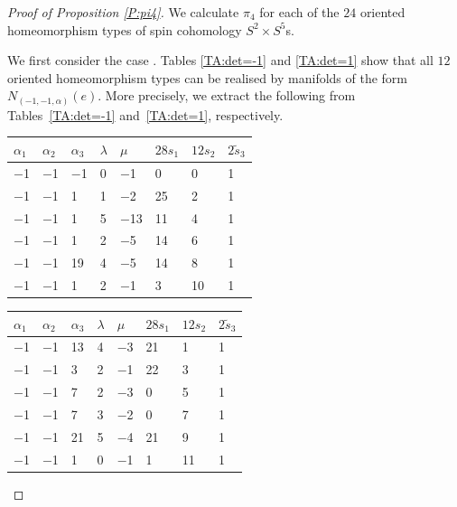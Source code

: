 \documentclass[10pt,a4paper]{amsart}
\numberwithin{equation}{section}
\theoremstyle{definition}
\numberwithin{table}{section}
\begin{document}
\begin{proof}[Proof of Proposition \ref{P:pi4}]
	We calculate $\pi_4$ for each of the $24$ oriented homeomorphism types of spin cohomology $S^2\times S^5$s.
	
	We first consider the case . Tables \ref{TA:det=-1} and \ref{TA:det=1} show that all $12$ oriented homeomorphism types can be realised by manifolds of the form $N_{(-1,-1,\alpha)}(e)$. More precisely, we extract the following from Tables~\ref{TA:det=-1} and~\ref{TA:det=1}, respectively.

	\vspace{0.3cm}

	\begin{paracol}{2}\centering
		\begin{supertabular}{|w{c}{.5cm}w{c}{.5cm}w{c}{.5cm}w{c}{.5cm}w{c}{.5cm}|w{c}{.5cm}w{c}{.5cm}w{c}{.5cm}|}
			\hline $\alpha_1$ & $\alpha_2$ & $\alpha_3$ & $\lambda$ & $\mu$ & $28s_1$ & $12s_2$ & $2\tilde{s}_3$ \\ \hline
			$-$1 & $-$1 & $-$1 & 0 & $-$1 & 0 & 0 & 1 \\
			$-$1 & $-$1 & 1 & 1 & $-$2 & 25 & 2 & 1\\
			$-$1 & $-$1 & 1 & 5 & $-$13 & 11 & 4 & 1\\
			$-$1 & $-$1 & 1 & 2 & $-$5 & 14 & 6 & 1\\
			$-$1 & $-$1 & 19 & 4 & $-$5 & 14 & 8 & 1\\
			$-$1 & $-$1 & 1 & 2 & $-$1 & 3 & 10 & 1\\\hline
		\end{supertabular}
		
		\switchcolumn
		
		\begin{supertabular}{|w{c}{.5cm}w{c}{.5cm}w{c}{.5cm}w{c}{.5cm}w{c}{.5cm}|w{c}{.5cm}w{c}{.5cm}w{c}{.5cm}|}
			\hline $\alpha_1$ & $\alpha_2$ & $\alpha_3$ & $\lambda$ & $\mu$ & $28s_1$ & $12s_2$ & $2\tilde{s}_3$ \\ \hline
			$-$1 & $-$1 & 13 & 4 & $-$3 & 21 & 1 & 1\\
			$-$1 & $-$1 & 3 & 2 & $-$1 & 22 & 3 & 1\\
			$-$1 & $-$1 & 7 & 2 & $-$3 & 0 & 5 & 1\\
			$-$1 & $-$1 & 7 & 3 & $-$2 & 0 & 7 & 1\\
			$-$1 & $-$1 & 21 & 5 & $-$4 & 21 & 9 & 1\\
			$-$1 & $-$1 & 1 & 0 & $-$1 & 1 & 11 & 1\\ \hline
		\end{supertabular}
	\end{paracol}
	

\end{proof}
\end{document}
